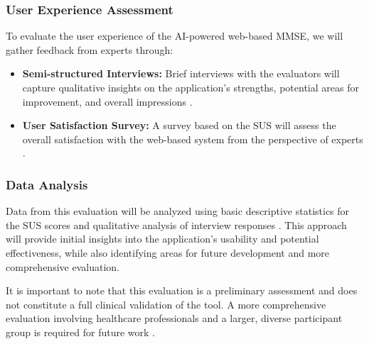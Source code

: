\subsubsection{User Experience Assessment}
To evaluate the user experience of the AI-powered web-based MMSE, we will gather feedback from experts through:
\begin{itemize}
\item \textbf{Semi-structured Interviews:} Brief interviews with the evaluators will capture qualitative insights on the application's strengths, potential areas for improvement, and overall impressions \cite{Wild2021}.
\item \textbf{User Satisfaction Survey:} A survey based on the SUS will assess the overall satisfaction with the web-based system from the perspective of experts \cite{Brooke1996}.
\end{itemize}

\subsubsection{Data Analysis}
Data from this evaluation will be analyzed using basic descriptive statistics for the SUS scores and qualitative analysis of interview responses \cite{Braun2006}. This approach will provide initial insights into the application's usability and potential effectiveness, while also identifying areas for future development and more comprehensive evaluation.

It is important to note that this evaluation is a preliminary assessment and does not constitute a full clinical validation of the tool. A more comprehensive evaluation involving healthcare professionals and a larger, diverse participant group is required for future work \cite{Geddes2020}.